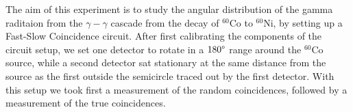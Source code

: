 The aim of this experiment is to study the angular distribution of the gamma raditaion from the $\gamma-\gamma$ cascade from the decay of $^{60}$Co to $^{60}$Ni, by setting up a Fast-Slow Coincidence circuit. After first calibrating the components of the circuit setup, we set one detector to rotate in a $180\degree$ range around the $^{60}$Co source, while a second detector sat stationary at the same distance from the source as the first outside the semicircle traced out by the first detector. With this setup we took first a measurement of the random coincidences, followed by a measurement of the true coincidences.\\